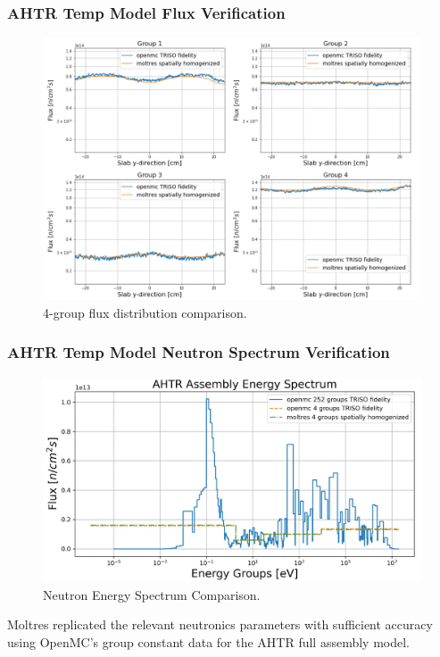 \begin{frame}
    \frametitle{AHTR Temp Model Flux Verification}
    \begin{figure}[]
        \centering
        \includegraphics[width=0.8\linewidth]{figures/benchmark-flux.png} 
        \caption{4-group flux distribution comparison.}
    \end{figure}
\end{frame}

\begin{frame}
    \frametitle{AHTR Temp Model Neutron Spectrum Verification}
            \begin{figure}[]
                \centering
                \includegraphics[width=0.75\linewidth]{figures/benchmark-spectrum.png} 
                \caption{Neutron Energy Spectrum Comparison.}
            \end{figure}
        Moltres replicated the relevant neutronics parameters with sufficient accuracy
        using OpenMC's group constant data for the AHTR full assembly model.
\end{frame}

